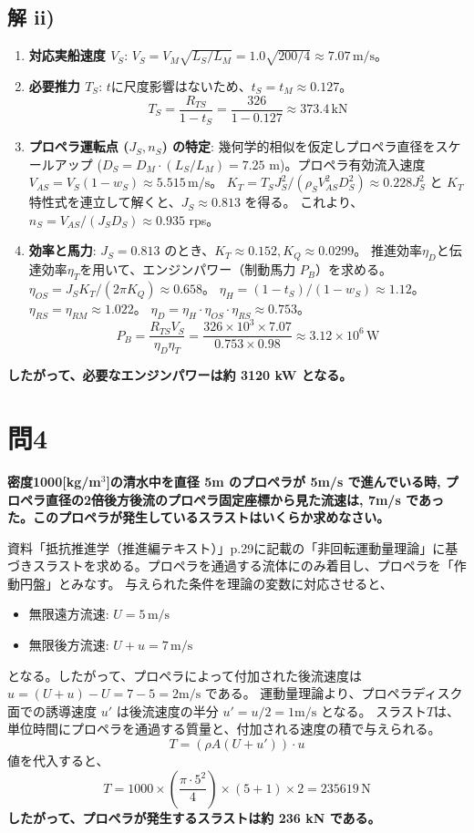 \documentclass[12pt, a4paper, leqno, dvipdfmx]{jarticle}
\begin{document}
\subsection*{解 ii)}
\begin{enumerate}
    \item \textbf{対応実船速度 $V_S$}: $V_S = V_M \sqrt{L_S/L_M} = 1.0 \sqrt{200/4} \approx 7.07 \, \text{m/s}$。
    \item \textbf{必要推力 $T_S$}: $t$に尺度影響はないため、$t_S = t_M \approx 0.127$。
    $$ T_S = \frac{R_{TS}}{1-t_S} = \frac{326}{1-0.127} \approx 373.4 \, \text{kN} $$
    \item \textbf{プロペラ運転点 ($J_S, n_S$) の特定}: 幾何学的相似を仮定しプロペラ直径をスケールアップ ($D_S = D_M \cdot (L_S/L_M) = 7.25$ m)。プロペラ有効流入速度 $V_{AS} = V_S (1-w_S) \approx 5.515 \, \text{m/s}$。
    $K_T = T_S J_S^2 / (\rho_S V_{AS}^2 D_S^2) \approx 0.228 J_S^2$ と $K_T$特性式を連立して解くと、$J_S \approx 0.813$ を得る。
    これより、$n_S = V_{AS} / (J_S D_S) \approx 0.935$ rps。
    \item \textbf{効率と馬力}: $J_S=0.813$ のとき、$K_T \approx 0.152, K_Q \approx 0.0299$。
    推進効率$\eta_D$と伝達効率$\eta_T$を用いて、エンジンパワー（制動馬力 $P_B$）を求める。
    $\eta_{OS} = J_S K_T / (2\pi K_Q) \approx 0.658$。
    $\eta_H = (1-t_S)/(1-w_S) \approx 1.12$。
    $\eta_{RS} = \eta_{RM} \approx 1.022$。
    $\eta_D = \eta_H \cdot \eta_{OS} \cdot \eta_{RS} \approx 0.753$。
    $$ P_B = \frac{R_{TS} V_S}{\eta_D \eta_T} = \frac{326 \times 10^3 \times 7.07}{0.753 \times 0.98} \approx 3.12 \times 10^6 \, \text{W} $$
\end{enumerate}
\textbf{したがって、必要なエンジンパワーは約 3120 kW となる。}

\newpage
\section*{問4}
\textbf{密度1000[kg/m$^3$]の清水中を直径 5m のプロペラが 5m/s で進んでいる時, プロペラ直径の2倍後方後流のプロペラ固定座標から見た流速は, 7m/s であった。このプロペラが発生しているスラストはいくらか求めなさい。}

\vspace{5mm}
資料「抵抗推進学（推進編テキスト）」p.29に記載の「非回転運動量理論」に基づきスラストを求める。プロペラを通過する流体にのみ着目し、プロペラを「作動円盤」とみなす。
与えられた条件を理論の変数に対応させると、
\begin{itemize}
    \item 無限遠方流速: $U = 5 \, \text{m/s}$
    \item 無限後方流速: $U+u = 7 \, \text{m/s}$
\end{itemize}
となる。したがって、プロペラによって付加された後流速度は $u = (U+u) - U = 7 - 5 = 2\text{m/s}$ である。
運動量理論より、プロペラディスク面での誘導速度 $u'$ は後流速度の半分 $u' = u/2 = 1\text{m/s}$ となる。
スラスト$T$は、単位時間にプロペラを通過する質量と、付加される速度の積で与えられる。
$$ T = (\rho A (U+u')) \cdot u $$
値を代入すると、
$$ T = 1000 \times (\frac{\pi \cdot 5^2}{4}) \times (5+1) \times 2 = 235619 \, \text{N} $$
\textbf{したがって、プロペラが発生するスラストは約 236 kN である。}
\end{document}
